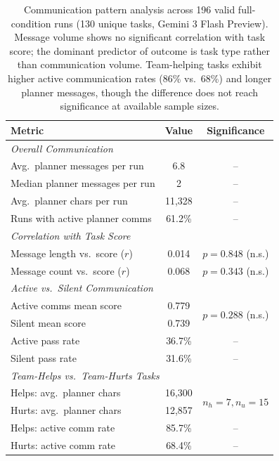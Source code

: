 \begin{table}[t]
\centering
\caption{Communication pattern analysis across 196 valid full-condition runs (130 unique tasks, Gemini 3 Flash Preview). Message volume shows no significant correlation with task score; the dominant predictor of outcome is task type rather than communication volume. Team-helping tasks exhibit higher active communication rates (86\% vs.\ 68\%) and longer planner messages, though the difference does not reach significance at available sample sizes.}
\label{tab:communication}
\small
\begin{tabular}{lcc}
\toprule
\textbf{Metric} & \textbf{Value} & \textbf{Significance} \\
\midrule
\multicolumn{3}{l}{\textit{Overall Communication}} \\
Avg.\ planner messages per run & 6.8 & -- \\
Median planner messages per run & 2 & -- \\
Avg.\ planner chars per run & 11,328 & -- \\
Runs with active planner comms & 61.2\% & -- \\
\midrule
\multicolumn{3}{l}{\textit{Correlation with Task Score}} \\
Message length vs.\ score ($r$) & 0.014 & $p = 0.848$ (n.s.) \\
Message count vs.\ score ($r$) & 0.068 & $p = 0.343$ (n.s.) \\
\midrule
\multicolumn{3}{l}{\textit{Active vs.\ Silent Communication}} \\
Active comms mean score & 0.779 & \multirow{2}{*}{$p = 0.288$ (n.s.)} \\
Silent mean score & 0.739 & \\
Active pass rate & 36.7\% & -- \\
Silent pass rate & 31.6\% & -- \\
\midrule
\multicolumn{3}{l}{\textit{Team-Helps vs.\ Team-Hurts Tasks}} \\
Helps: avg.\ planner chars & 16,300 & \multirow{2}{*}{$n_h=7, n_u=15$} \\
Hurts: avg.\ planner chars & 12,857 & \\
Helps: active comm rate & 85.7\% & -- \\
Hurts: active comm rate & 68.4\% & -- \\
\bottomrule
\end{tabular}
\end{table}
